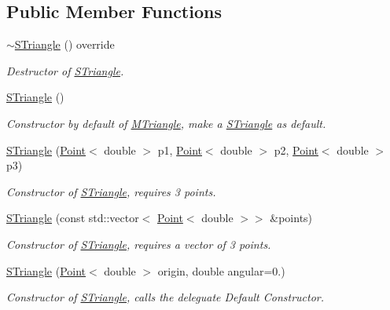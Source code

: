 \subsection*{Public Member Functions}
\begin{DoxyCompactItemize}
\item 
\mbox{\label{classSTriangle_ad278fb75870a545bcb6617058c77d73f}} 
\hyperlink{classSTriangle_ad278fb75870a545bcb6617058c77d73f}{$\sim$\+S\+Triangle} () override
\begin{DoxyCompactList}\small\item\em Destructor of \hyperlink{classSTriangle}{S\+Triangle}. \end{DoxyCompactList}\item 
\mbox{\label{classSTriangle_a4a1f67c28ab4247e1cb17f0d9366c372}} 
\hyperlink{classSTriangle_a4a1f67c28ab4247e1cb17f0d9366c372}{S\+Triangle} ()
\begin{DoxyCompactList}\small\item\em Constructor by default of \hyperlink{classMTriangle}{M\+Triangle}, make a \hyperlink{classSTriangle}{S\+Triangle} as default. \end{DoxyCompactList}\item 
\hyperlink{classSTriangle_ab477566a2c226844ab5571da4ed30c29}{S\+Triangle} (\hyperlink{classPoint}{Point}$<$ double $>$ p1, \hyperlink{classPoint}{Point}$<$ double $>$ p2, \hyperlink{classPoint}{Point}$<$ double $>$ p3)
\begin{DoxyCompactList}\small\item\em Constructor of \hyperlink{classSTriangle}{S\+Triangle}, requires 3 points. \end{DoxyCompactList}\item 
\hyperlink{classSTriangle_a8f2ab53b44dc98304749993a97d7b04a}{S\+Triangle} (const std\+::vector$<$ \hyperlink{classPoint}{Point}$<$ double $>$$>$ \&points)
\begin{DoxyCompactList}\small\item\em Constructor of \hyperlink{classSTriangle}{S\+Triangle}, requires a vector of 3 points. \end{DoxyCompactList}\item 
\hyperlink{classSTriangle_acea39386c34a9f216691a93b5238152d}{S\+Triangle} (\hyperlink{classPoint}{Point}$<$ double $>$ origin, double angular=0.)
\begin{DoxyCompactList}\small\item\em Constructor of \hyperlink{classSTriangle}{S\+Triangle}, calls the deleguate Default Constructor. \end{DoxyCompactList}\item 
$$
\end{DoxyCompactItemize}
